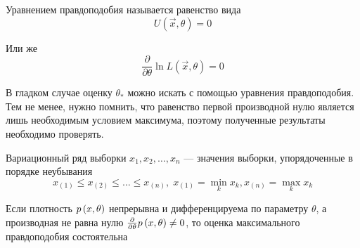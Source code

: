 \begin{definition}
  Уравнением правдоподобия называется равенство вида
  $$U\left( \vec{x},\theta \right)=0$$

  Или же
  $$\frac{\partial}{\partial\theta}\ln{L\left( \vec{x},\theta \right)}=0$$
\end{definition}

\begin{remark}
  В гладком случае оценку $\theta_*$ можно искать
  с помощью уравнения правдоподобия.
  Тем не менее, нужно помнить, что равенство первой производной нулю
  является лишь необходимым условием максимума,
  поэтому полученные результаты необходимо проверять.
\end{remark}

\begin{definition}
  Вариационный ряд выборки $x_1, x_2, \dots, x_n$ --- значения выборки,
  упорядоченные в порядке неубывания
  $$x_{\left(1\right)} \le x_{\left(2\right)} \le \dots
    \le x_{\left(n\right)},\;
    x_{\left(1\right)}=\underset{k}\min{x_k},
    x_{\left(n\right)}=\underset{k}\max{x_k}$$
\end{definition}

\begin{theorem}
  Если плотность $p\left(x,\theta\right)$
  непрерывна и дифференцируема по параметру $\theta$,
  а производная не равна нулю
  $\frac{\partial}{\partial\theta}p\left(x,\theta\right)\neq 0$,
  то оценка максимального правдоподобия состоятельна
\end{theorem}
